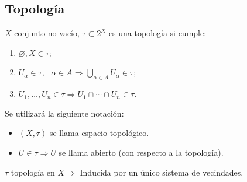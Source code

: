 \documentclass[a4paper]{report}
\begin{document}
	\subsection{Topología}

	\begin{definition}[topología]
		$X$ conjunto no vacío, $\tau \subset 2^X$ es una topología si cumple:

		\begin{enumerate}
			\item $\varnothing, X \in \tau$;

			\item $U_{\alpha} \in \tau, \text{ } \alpha \in A \Rightarrow \bigcup_{\alpha \in A} U_{\alpha} \in \tau$;

			\item $U_1,\dots,U_n \in \tau \Rightarrow U_1 \cap \cdots \cap U_n \in \tau$.
		\end{enumerate}
	\end{definition}

	\begin{remark}
		Se utilizará la siguiente notación:
		\begin{itemize}
			\item $(X,\tau)$ se llama espacio topológico.

			\item $U \in \tau \Rightarrow U$ se llama abierto (con respecto a la topología).
		\end{itemize}
	\end{remark}

	\begin{lemma}
		$\tau$ topología en $X \Rightarrow$ Inducida por un único sistema de vecindades.
	\end{lemma}
\end{document}
